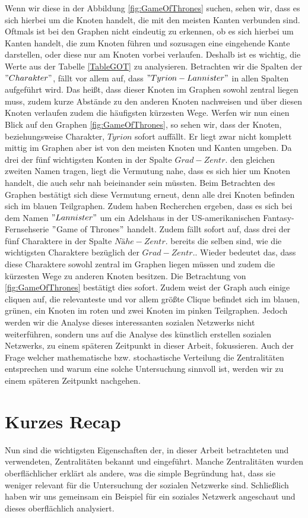 Wenn wir diese in der Abbildung \ref{fig:GameOfThrones} suchen, sehen wir, dass es sich hierbei um die Knoten handelt, die mit den meisten Kanten verbunden sind. Oftmals ist bei den Graphen nicht eindeutig zu erkennen, ob es sich hierbei um Kanten handelt, die zum Knoten führen und sozusagen eine eingehende Kante darstellen, oder diese nur am Knoten vorbei verlaufen. Deshalb ist es wichtig, die Werte aus der Tabelle \ref{TableGOT} zu analysieren. Betrachten wir die Spalten der $"Charakter"$, fällt vor allem auf, dass $"Tyrion -Lannister"$ in allen  Spalten aufgeführt wird. Das heißt, dass dieser Knoten im Graphen sowohl zentral liegen muss, zudem kurze Abstände zu den anderen Knoten nachweisen und über diesen Knoten verlaufen zudem die häufigsten kürzesten Wege. Werfen wir nun einen Blick auf den Graphen \ref{fig:GameOfThrones}, so sehen wir, dass der Knoten, beziehungsweise Charakter, $Tyrion$  sofort auffällt. Er liegt zwar nicht komplett mittig im Graphen aber ist von den meisten Knoten und Kanten umgeben. Da drei der fünf wichtigsten Konten  in der Spalte $Grad-Zentr.$ den gleichen zweiten Namen tragen, liegt die Vermutung nahe, dass es sich hier um Knoten handelt, die auch sehr nah beieinander sein müssten. Beim Betrachten des Graphen bestätigt sich diese Vermutung erneut, denn alle drei Knoten befinden sich im blauen Teilgraphen. Zudem haben Recherchen ergeben, dass es sich bei dem Namen $"Lannister"$ um ein Adelshaus in der US-amerikanischen Fantasy-Fernsehserie $"$Game of Thrones$"$ handelt. Zudem fällt sofort auf, dass drei der fünf Charaktere in der Spalte $Nähe-Zentr.$ bereits die selben sind, wie die wichtigsten Charaktere bezüglich der $Grad-Zentr.$. Wieder bedeutet das, dass diese Charaktere sowohl zentral im Graphen liegen müssen und zudem die kürzesten Wege zu anderen Knoten besitzen. Die Betrachtung von \ref{fig:GameOfThrones} bestätigt dies sofort. Zudem weist der Graph auch einige cliquen auf, die relevanteste und vor allem größte Clique befindet sich im blauen, grünen, ein Knoten im roten und zwei Knoten im pinken Teilgraphen. Jedoch werden wir die Analyse dieses interessanten sozialen Netzwerks nicht weiterführen, sondern uns auf die Analyse des künstlich erstellen sozialen Netzwerks, zu einem späteren Zeitpunkt in dieser Arbeit, fokussieren. Auch der Frage welcher mathematische bzw. stochastische Verteilung die Zentralitäten entsprechen und warum eine solche Untersuchung sinnvoll ist, werden wir zu einem späteren Zeitpunkt nachgehen.


\section{Kurzes Recap}
Nun sind die wichtigsten Eigenschaften der, in dieser Arbeit betrachteten und verwendeten, Zentralitäten bekannt und eingeführt. Manche Zentralitäten wurden oberflächlicher erklärt als andere, was die simple Begründung hat, dass sie weniger relevant für die Untersuchung der sozialen Netzwerke sind. Schließlich haben wir uns gemeinsam ein Beispiel für ein soziales Netzwerk angeschaut und dieses oberflächlich analysiert.

